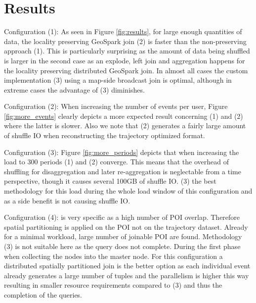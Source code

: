 \documentclass[conference]{IEEEtran}
\begin{document}
\section{Results}
Configuration (1): As seen in Figure \ref{fig:results}, for large enough quantities of data, the locality preserving GeoSpark join (2) is faster than the non-preserving approach (1).
This is particularly surprising as the amount of data being shuffled is larger in the second case as an explode, left join and aggregation happens for the locality preserving distributed GeoSpark join.
In almost all cases the custom implementation (3) using a map-side broadcast join is optimal,
although in extreme cases the advantage of (3) diminishes.

Configuration (2): When increasing the number of events per user, Figure \ref{fig:more_events} clearly depicts a more expected result concerning (1) and (2) where the latter is slower.
Also we note that (2) generates a fairly large amount of shuffle IO when reconstructing the trajectory optimized format.

Configuration (3): Figure \ref{fig:more_periods} depicts that when increasing the load to 300 periods (1) and (2) converge.
This means that the overhead of shuffling for disaggregation and later re-aggregation is neglectable from a time perspective, though it causes several 100GB of shuffle IO.
(3) the best methodology for this load during the whole load window of this configuration and as a side benefit is not causing shuffle IO.

Configuration (4): is very specific as a high number of POI overlap.
Therefore spatial partitioning is applied on the POI not on the trajectory dataset.
Already for a minimal workload, large number of joinable POI are found. Methodology (3) is not
 suitable here as the query does not complete. During the first phase when collecting the nodes into the master node.
For this configuration a distributed spatially partitioned join is the
better option as each individual event already generates a large number of tuples and the parallelism is higher this way resulting in smaller resource requirements compared to (3) and thus the completion of the queries.
\end{document}

